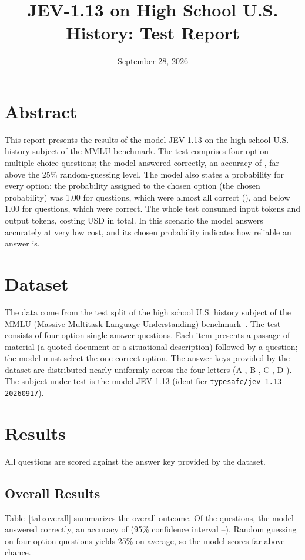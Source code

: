 \documentclass[10pt,a4paper,twocolumn]{article}
\title{\sffamily JEV-1.13 on High School U.S. History: Test Report}
\author{}
\date{September 28, 2026}
\begin{document}
\maketitle

\section*{Abstract}
This report presents the results of the model JEV-1.13 on the high school
U.S. history subject of the MMLU benchmark. The test comprises \NumSamples{}
four-option multiple-choice questions; the model answered \NumCorrect{}
correctly, an accuracy of \AccTotal{}, far above the 25\% random-guessing
level. The model also states a probability for every option: the probability
assigned to the chosen option (the chosen probability) was 1.00 for
\NCertain{} questions, which were almost all correct (\AccCertain{}), and
below 1.00 for \NUncertain{} questions, which were \AccUncertain{} correct.
The whole test consumed \InputTokens{} input tokens and
\OutputTokens{} output tokens, costing USD \TotalCost{} in total. In this
scenario the model answers accurately at very low cost, and its chosen
probability indicates how reliable an answer is.

\section{Dataset}
The data come from the test split of the high school U.S. history subject of
the MMLU (Massive Multitask Language Understanding) benchmark~\cite{mmlu}. The test
consists of \NumSamples{} four-option single-answer questions. Each item
presents a passage of material (a quoted document or a situational
description) followed by a question; the model must select the one correct
option. The answer keys provided by the dataset are distributed nearly
uniformly across
the four letters (A \KeyLetterA{}, B \KeyLetterB{}, C \KeyLetterC{}, D
\KeyLetterD{}). The subject under test is the model JEV-1.13 (identifier
\texttt{typesafe/jev-1.13-20260917}).

\section{Results}
All questions are scored against the answer key provided by the dataset.

\subsection{Overall Results}
Table~\ref{tab:overall} summarizes the overall outcome. Of the \NumSamples{}
questions, the model answered \NumCorrect{} correctly, an accuracy of
\AccTotal{} (95\% confidence interval \AccCILow{}--\AccCIHigh{}). Random
guessing on four-option questions yields 25\% on average, so the model scores
far above chance.
\end{document}
